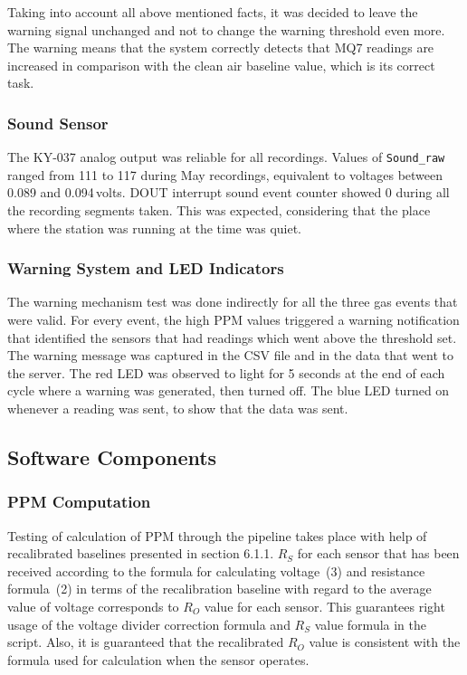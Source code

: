 Taking into account all above mentioned facts, it was decided to leave the warning signal
unchanged and not to change the warning threshold even more. The warning means that the system
correctly detects that MQ7 readings are increased in comparison with the clean air baseline
value, which is its correct task.

\subsubsection*{Sound Sensor}

The KY-037 analog output was reliable for all recordings. Values of \texttt{Sound\_raw} ranged
from 111 to 117 during May recordings, equivalent to voltages between 0.089 and 0.094\,volts.
DOUT interrupt sound event counter showed 0 during all the recording segments taken. This was
expected, considering that the place where the station was running at the time was quiet.

\subsubsection*{Warning System and LED Indicators}

The warning mechanism test was done indirectly for all the three gas events that were valid.
For every event, the high PPM values triggered a warning notification that identified the
sensors that had readings which went above the threshold set. The warning message was captured
in the CSV file and in the data that went to the server. The red LED was observed to light for
5 seconds at the end of each cycle where a warning was generated, then turned off. The blue LED
turned on whenever a reading was sent, to show that the data was sent.

\subsection{Software Components}
\label{subsec:sw-testing}

\subsubsection*{PPM Computation}

Testing of calculation of PPM through the pipeline takes place with help of recalibrated
baselines presented in section 6.1.1. $R_S$ for each sensor that has been received according
to the formula for calculating voltage~(3) and resistance formula~(2) in terms of the
recalibration baseline with regard to the average value of voltage corresponds to $R_O$ value
for each sensor. This guarantees right usage of the voltage divider correction formula and
$R_S$ value formula in the script. Also, it is guaranteed that the recalibrated $R_O$ value is
consistent with the formula used for calculation when the sensor operates.

